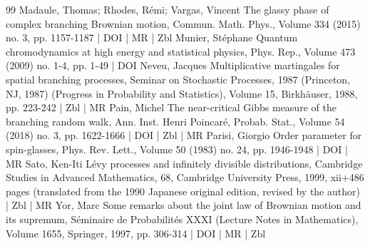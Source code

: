 \documentclass[10pt]{amsart}
\theoremstyle{definition}\newtheorem{defi}[theo]{Definition}\newtheorem{rema}[theo]{Remark}\newtheorem{exam}[theo]{Example}\newtheorem{exem}[theo]{Example}\newtheorem{nota}[theo]{Notation}
\newcommand\1{\mathds{1}}
\begin{document}
\begin{thebibliography}{99}
 Madaule, Thomas; Rhodes, Rémi; Vargas, Vincent The glassy phase of complex branching Brownian motion, Commun. Math. Phys., Volume 334 (2015) no. 3, pp. 1157-1187 | DOI | MR | Zbl
 Munier, Stéphane Quantum chromodynamics at high energy and statistical physics, Phys. Rep., Volume 473 (2009) no. 1-4, pp. 1-49 | DOI
 Neveu, Jacques Multiplicative martingales for spatial branching processes, Seminar on Stochastic Processes, 1987 (Princeton, NJ, 1987) (Progress in Probability and Statistics), Volume 15, Birkhäuser, 1988, pp. 223-242 | Zbl | MR
 Pain, Michel The near-critical Gibbs measure of the branching random walk, Ann. Inst. Henri Poincaré, Probab. Stat., Volume 54 (2018) no. 3, pp. 1622-1666 | DOI | Zbl | MR
 Parisi, Giorgio Order parameter for spin-glasses, Phys. Rev. Lett., Volume 50 (1983) no. 24, pp. 1946-1948 | DOI | MR
 Sato, Ken-Iti Lévy processes and infinitely divisible distributions, Cambridge Studies in Advanced Mathematics, 68, Cambridge University Press, 1999, xii+486 pages (translated from the 1990 Japanese original edition, revised by the author) | Zbl | MR
 Yor, Marc Some remarks about the joint law of Brownian motion and its supremum, Séminaire de Probabilités XXXI (Lecture Notes in Mathematics), Volume 1655, Springer, 1997, pp. 306-314 | DOI | MR | Zbl
\end{thebibliography}
\end{document}
